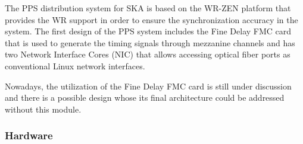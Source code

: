 
The PPS distribution system for SKA is based on the WR-ZEN platform that provides the WR support in order to ensure the synchronization accuracy in the system. The first design of the PPS system includes the Fine Delay FMC card that is used to generate the timing signals through mezzanine channels and has two Network Interface Cores (NIC) that allows accessing optical fiber ports as conventional Linux network interfaces.

Nowadays, the utilization of the Fine Delay FMC card is still under discussion and there is a possible design whose its final architecture could be addressed without this module.

\subsubsection{Hardware}
\label{subsec:hardware}

%
%

